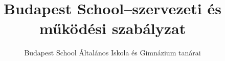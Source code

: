 \documentclass[magyar,12pt,a4paper]{report}
\begin{document}
\newif\ifkerettanterv
\kerettantervfalse

\title{Budapest School–szervezeti és működési szabályzat}
\author{Budapest School Általános Iskola és Gimnázium tanárai}
\maketitle


\tableofcontents
\newpage



{}
\label{sec:bibliographyk}

 
\end{document}
